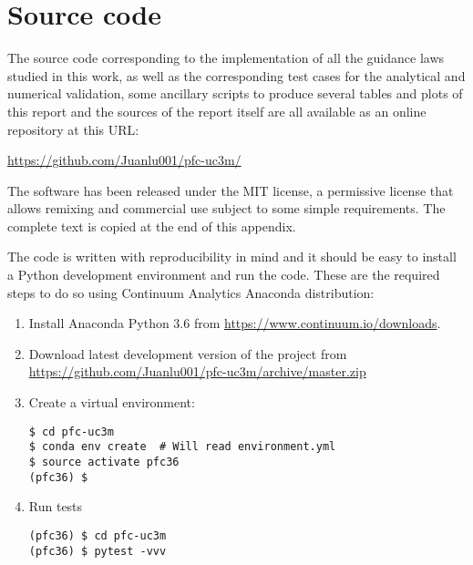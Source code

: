 \chapter{Source code}

The source code corresponding to the implementation of all the guidance laws studied in this work, as well as the corresponding test cases for the analytical and numerical validation, some ancillary scripts to produce several tables and plots of this report and the sources of the report itself are all available as an online repository at this URL:

\vspace{0.5cm}
\url{https://github.com/Juanlu001/pfc-uc3m/}
\vspace{0.5cm}

The software has been released under the MIT license, a permissive license that allows remixing and commercial use subject to some simple requirements. The complete text is copied at the end of this appendix.

The code is written with reproducibility in mind and it should be easy to install a Python development environment and run the code. These are the required steps to do so using Continuum Analytics Anaconda distribution:

\begin{enumerate}
\item Install Anaconda Python 3.6 from \url{https://www.continuum.io/downloads}.

\item Download latest development version of the project from \url{https://github.com/Juanlu001/pfc-uc3m/archive/master.zip}

\item Create a virtual environment:

\begin{verbatim}
$ cd pfc-uc3m
$ conda env create  # Will read environment.yml
$ source activate pfc36
(pfc36) $
\end{verbatim}

\item Run tests

\begin{verbatim}
(pfc36) $ cd pfc-uc3m
(pfc36) $ pytest -vvv
\end{verbatim}

\end{enumerate}

\clearpage

